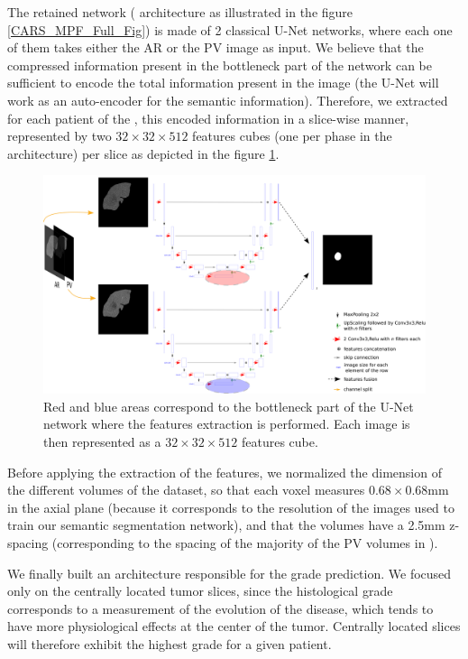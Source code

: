 The retained network ( architecture as illustrated in the figure \ref{CARS_MPF_Full_Fig}) is made of 2 classical U-Net networks, where each
one of them takes either the AR or the PV image as input. We believe
that the compressed information present in the bottleneck part of the
network can be sufficient to encode the total information present in the
image (the U-Net will work as an auto-encoder for the semantic information). Therefore, we extracted for each patient of the , this
encoded information in a slice-wise manner, represented by two $ 32\times32\times512 $
features cubes (one per phase in the  architecture) per slice
as depicted in the figure \ref{fig:MPF_Features_Selection}.


\begin{figure}[th!]
\centering
\includegraphics[width=0.95\linewidth]{images/MPF_Features_Selection}
\caption{Red and blue areas correspond to the bottleneck part of the U-Net
network where the features extraction is performed. Each image is then
represented as a $ 32\times32\times512 $ features cube.}
\label{fig:MPF_Features_Selection}
\end{figure}


Before applying the extraction of the features, we normalized
the dimension of the different volumes of the dataset, so that each
voxel measures $ 0.68\times0.68 $mm in the axial plane (because it corresponds to
the resolution of the images used to train our semantic segmentation
network), and that the volumes have a 2.5mm z-spacing (corresponding to the
spacing of the majority of the PV volumes in ).

We finally built an architecture responsible for the grade prediction.
We focused only on the centrally located tumor slices, since the
histological grade corresponds to a measurement of the evolution of the
disease, which tends to have more physiological effects at the center of
the tumor. Centrally located slices will therefore exhibit the highest
grade for a given patient.

